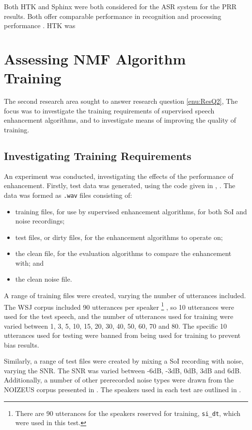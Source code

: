 Both \ac{HTK} and Sphinx were both considered for the \ac{ASR} system
for the \ac{PRR} results. Both offer comparable performance in recognition
and processing performance \citep{Vertanen2006}. \ac{HTK} was 


\section{Assessing \acl{NMF} Algorithm Training}

The second research area sought to answer research question \ref{enu:ResQ2},
\textit{\RQtwo{}} The focus was to investigate the training requirements
of supervised speech enhancement algorithms, and to investigate means
of improving the quality of training.


\subsection{\label{sub:Investigating-Training-Req}Investigating Training Requirements}

An experiment was conducted, investigating the effects of the performance
of enhancement. Firstly, test data was generated, using the code given
in , \textit{}.
The data was formed as \lstinline[language=bash]!.wav! files consisting
of:
\begin{itemize}
\item training files, for use by supervised enhancement algorithms, for
both \ac{SoI} and noise recordings;
\item test files, or dirty files, for the enhancement algorithms to operate
on;
\item the clean file, for the evaluation algorithms to compare the enhancement
with; and
\item the clean noise file.
\end{itemize}
A range of training files were created, varying the number of utterances
included. The \ac{WSJ} corpus included 90 utterances per speaker%
\footnote{There are 90 utterances for the speakers reserved for training, \lstinline[language=bash]!si_dt!,
which were used in this test.%
} \citep{Fransen1994}, so 10 utterances were used for the test speech,
and the number of utterances used for training were varied between
1, 3, 5, 10, 15, 20, 30, 40, 50, 60, 70 and 80. The specific 10 utterances
used for testing were banned from being used for training to prevent
bias results.

Similarly, a range of test files were created by mixing a \ac{SoI}
recording with noise, varying the \ac{SNR}. The \ac{SNR} was varied
between -6dB, -3dB, 0dB, 3dB and 6dB. Additionally, a number of other
prerecorded noise types were drawn from the NOIZEUS corpus presented
in \citep{Hu2006}. The speakers used in each test are outlined in
.

